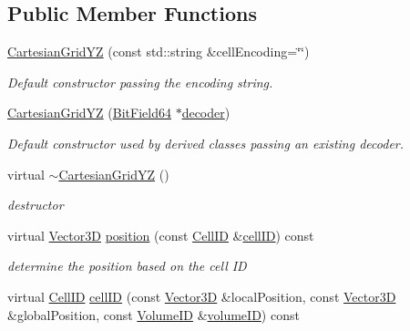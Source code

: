 \subsection*{Public Member Functions}
\begin{DoxyCompactItemize}
\item 
\hyperlink{class_d_d4hep_1_1_d_d_segmentation_1_1_cartesian_grid_y_z_abed51e41abcba3100aef90bb0c65190d}{Cartesian\+Grid\+YZ} (const std\+::string \&cell\+Encoding=\char`\"{}\char`\"{})
\begin{DoxyCompactList}\small\item\em Default constructor passing the encoding string. \end{DoxyCompactList}\item 
\hyperlink{class_d_d4hep_1_1_d_d_segmentation_1_1_cartesian_grid_y_z_a9f4c387d36c1ce52d40f7eb85618c6fd}{Cartesian\+Grid\+YZ} (\hyperlink{class_d_d4hep_1_1_d_d_segmentation_1_1_bit_field64}{Bit\+Field64} $\ast$\hyperlink{class_d_d4hep_1_1_d_d_segmentation_1_1_segmentation_abec3489982d0fe91ef4b142d9d755576}{decoder})
\begin{DoxyCompactList}\small\item\em Default constructor used by derived classes passing an existing decoder. \end{DoxyCompactList}\item 
virtual \hyperlink{class_d_d4hep_1_1_d_d_segmentation_1_1_cartesian_grid_y_z_a79289b0fc6f6ff298284ac1bb2266c79}{$\sim$\+Cartesian\+Grid\+YZ} ()
\begin{DoxyCompactList}\small\item\em destructor \end{DoxyCompactList}\item 
virtual \hyperlink{struct_d_d4hep_1_1_d_d_segmentation_1_1_vector3_d}{Vector3D} \hyperlink{class_d_d4hep_1_1_d_d_segmentation_1_1_cartesian_grid_y_z_a830b4d74e64bc4dabf7fc763176affd1}{position} (const \hyperlink{namespace_d_d4hep_1_1_d_d_segmentation_ac7af071d85cb48820914434a07e21ba1}{Cell\+ID} \&\hyperlink{class_d_d4hep_1_1_d_d_segmentation_1_1_cartesian_grid_y_z_a20f6a732320e5d4b73643c3d8784ba7b}{cell\+ID}) const
\begin{DoxyCompactList}\small\item\em determine the position based on the cell ID \end{DoxyCompactList}\item 
virtual \hyperlink{namespace_d_d4hep_1_1_d_d_segmentation_ac7af071d85cb48820914434a07e21ba1}{Cell\+ID} \hyperlink{class_d_d4hep_1_1_d_d_segmentation_1_1_cartesian_grid_y_z_a20f6a732320e5d4b73643c3d8784ba7b}{cell\+ID} (const \hyperlink{struct_d_d4hep_1_1_d_d_segmentation_1_1_vector3_d}{Vector3D} \&local\+Position, const \hyperlink{struct_d_d4hep_1_1_d_d_segmentation_1_1_vector3_d}{Vector3D} \&global\+Position, const \hyperlink{namespace_d_d4hep_1_1_d_d_segmentation_a61a6833a18d1800bdef176595f83e3ba}{Volume\+ID} \&\hyperlink{class_d_d4hep_1_1_d_d_segmentation_1_1_segmentation_a43c0e9648e3b7cded015847c0802f757}{volume\+ID}) const

\end{DoxyCompactItemize}
